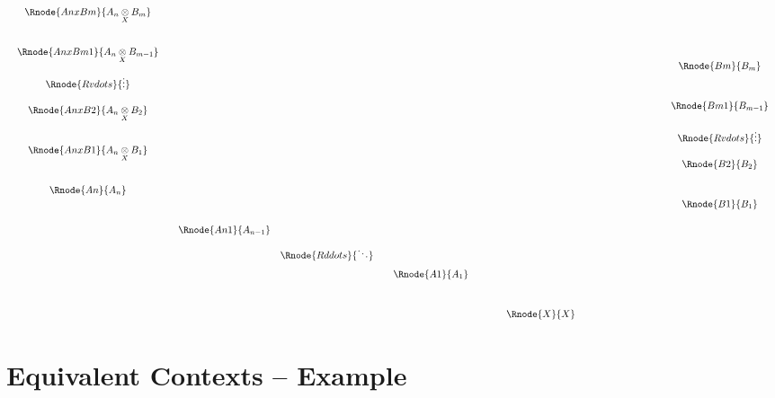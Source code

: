 \documentclass[10pt,a4paper]{scrartcl}
\begin{document}
\begin{minipage}{\textwidth}
\begin{displaymath}
\begin{array}{cccp{2cm}c}
\begin{array} {c}
\Rnode{AnxBm}{\crossx{A_n}{B_m}{X}}      \\ [1.0cm]
\Rnode{AnxBm1}{\crossx{A_n}{B_{m-1}}{X}} \\ [0.5cm]
\raisebox{1.0cm}{$\Rnode{Rvdots}{\vdots}$}\\ [-0.5cm]
\Rnode{AnxB2}{\crossx{A_n}{B_2}{X}}       \\ [1.0cm]
\Rnode{AnxB1}{\crossx{A_n}{B_1}{X}}\\ [1.0cm]
\Rnode{An}{A_n}                    \\ [1.0cm]
         
\end{array} 
& & & &
\begin{array}{c}
                                    \\ [1.0cm]
              \Rnode{Bm}{B_m}       \\ [1.0cm]
              \Rnode{Bm1}{B_{m-1}}  \\ [0.5cm]
							\Rnode{Rvdots}{\vdots}\\ [0.5cm]
              \Rnode{B2}{B_2}       \\ [1.0cm]
              \Rnode{B1}{B_1}          
\end{array} \\
&\begin{array}{ccccc}
\Rnode{An1}{A_{n-1}}  \\ [0.25cm]
     &\Rnode{Rddots}{\ddots} \\ [0.25cm]
              &&&\Rnode{A1}{A_1}  \\ [1.0cm]
                 &&&&\hspace{1cm}\Rnode{X}{X} \\
\end{array} & & &
\end{array}
\end{displaymath}
 
\end{minipage}


\section{Equivalent Contexts -- Example}
\end{document}
